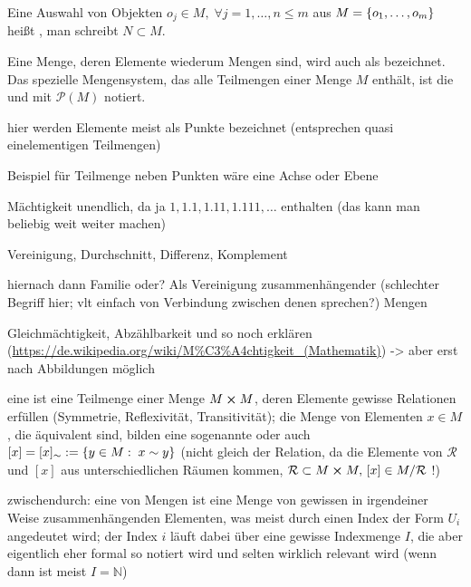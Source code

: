 \documentclass[../H_Analysis_main.tex]{subfiles}
\begin{document}
\begin{defi}
Eine Auswahl von Objekten $o_j \in M, \; \forall j = 1, \dots, n \leq m$ aus $M = \qty{o_1, \dots, o_m}$ heißt , man schreibt $N \subset M$.

Eine Menge, deren Elemente wiederum Mengen sind, wird auch als  bezeichnet. Das spezielle Mengensystem, das alle Teilmengen einer Menge $M$ enthält, ist die  und mit $\mathcal{P}(M)$ notiert.
\end{defi}


\begin{bsp}
hier werden Elemente meist als Punkte bezeichnet (entsprechen quasi einelementigen Teilmengen)

Beispiel für Teilmenge neben Punkten wäre eine Achse oder Ebene

Mächtigkeit unendlich, da ja $1, 1.1, 1.11, 1.111, \dots$ enthalten (das kann man beliebig weit weiter machen)
\end{bsp}


\begin{defi}[Mengenoperationen]
Vereinigung, Durchschnitt, Differenz, Komplement
\end{defi}

hiernach dann Familie oder? Als Vereinigung zusammenhängender (schlechter Begriff hier; vlt einfach von Verbindung zwischen denen sprechen?) Mengen



Gleichmächtigkeit, Abzählbarkeit und so noch erklären (\url{https://de.wikipedia.org/wiki/M%C3%A4chtigkeit_(Mathematik)}) -> aber erst nach Abbildungen möglich




eine  ist eine Teilmenge einer Menge $M \cross M$, deren Elemente gewisse Relationen erfüllen (Symmetrie, Reflexivität, Transitivität); die Menge von Elementen $x \in M$, die äquivalent sind, bilden eine sogenannte  oder auch  $[x] = [x]_\sim := \qty{y \in M: \; x \sim y}$ (nicht gleich der Relation, da die Elemente von $\mathcal{R}$ und $[x]$ aus unterschiedlichen Räumen kommen, $\mathcal{R} \subset M \cross M, \, [x] \in M/ \mathcal{R}$ !)


zwischendurch: eine  von Mengen ist eine Menge von gewissen in irgendeiner Weise zusammenhängenden Elementen, was meist durch einen Index der Form $U_i$ angedeutet wird; der Index $i$ läuft dabei über eine gewisse Indexmenge $I$, die aber eigentlich eher formal so notiert wird und selten wirklich relevant wird (wenn dann ist meist $I = \mathbb{N}$)
\end{document}
